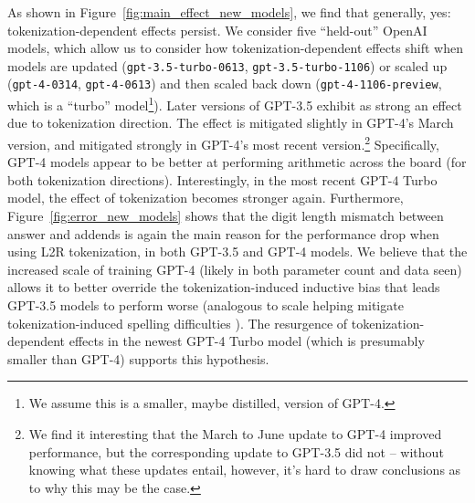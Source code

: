 \documentclass{article}
\theoremstyle{plain}
\theoremstyle{definition}
\theoremstyle{remark}
\begin{document}
As shown in Figure~\ref{fig:main_effect_new_models}, we find that generally, yes: tokenization-dependent effects persist. We consider five ``held-out'' OpenAI models, which allow us to consider how tokenization-dependent effects shift when models are updated (\texttt{gpt-3.5-turbo-0613}, \texttt{gpt-3.5-turbo-1106}) or scaled up (\texttt{gpt-4-0314}, \texttt{gpt-4-0613}) and then scaled back down (\texttt{gpt-4-1106-preview}, which is a ``turbo'' model\footnote{We assume this is a smaller, maybe distilled, version of GPT-4.}). Later versions of GPT-3.5 exhibit as strong an effect due to tokenization direction. The effect is mitigated slightly in GPT-4's March version, and mitigated strongly in GPT-4's most recent version.\footnote{We find it interesting that the March to June update to GPT-4 improved performance, but the corresponding update to GPT-3.5 did not -- without knowing what these updates entail, however, it's hard to draw conclusions as to why this may be the case.} Specifically, GPT-4 models appear to be better at performing arithmetic across the board (for both tokenization directions). Interestingly, in the most recent GPT-4 Turbo model, the effect of tokenization becomes stronger again. Furthermore, Figure~\ref{fig:error_new_models} shows that the digit length mismatch between answer and addends is again the main reason for the performance drop when using L2R tokenization, in both GPT-3.5 and GPT-4 models. We believe that the increased scale of training GPT-4 (likely in both parameter count and data seen) allows it to better override the tokenization-induced inductive bias that leads GPT-3.5 models to perform worse (analogous to scale helping mitigate tokenization-induced spelling difficulties \citep{liu2023character}). The resurgence of tokenization-dependent effects in the newest GPT-4 Turbo model (which is presumably smaller than GPT-4) supports this hypothesis.
\end{document}
